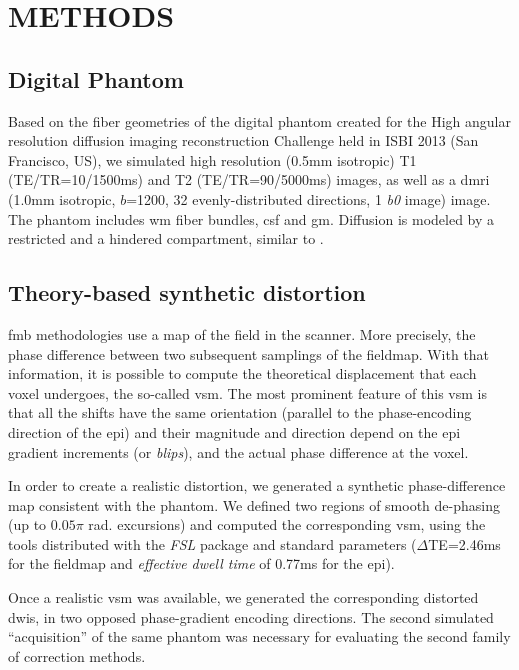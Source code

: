 \section{METHODS}

\subsection{Digital Phantom}
Based on the fiber geometries of the digital phantom 
created for the High angular resolution diffusion imaging 
reconstruction Challenge held in ISBI 2013 
(San Francisco, US), we simulated high resolution 
(0.5mm isotropic) T1 (TE/TR=10/1500ms) and T2 
(TE/TR=90/5000ms) images, as well as a \gls*{dmri}
(1.0mm isotropic, $b$=1200, 32 evenly-distributed 
directions, 1 \textit{b0} image) image.
The phantom includes \gls*{wm} fiber bundles, 
\gls*{csf} and \gls*{gm}. Diffusion is modeled by a 
restricted and a hindered compartment, similar to
\cite{assaf_composite_2005}.

\subsection{Theory-based synthetic distortion}
\label{sec:distortion}
\Gls*{fmb} methodologies use a map
of the field in the scanner. More precisely, the
phase difference between two subsequent samplings
of the fieldmap. With that information, it is possible
to compute the theoretical displacement that each
voxel undergoes, the so-called \gls*{vsm}. The
most prominent feature of this \gls*{vsm} is that all
the shifts have the same orientation (parallel to the
phase-encoding direction of the \gls*{epi}) and their
magnitude and direction depend on the \gls*{epi} 
gradient increments (or \emph{blips}), and the actual
phase difference at the voxel.

In order to create a realistic distortion, we
generated a synthetic phase-difference map 
consistent with the phantom.  We defined two regions 
of smooth de-phasing (up to $0.05\pi$ rad. excursions) 
and computed the corresponding \gls*{vsm}, using the 
tools distributed with the \emph{FSL} package 
\cite{jenkinson_fsl_2012}  and
standard parameters ($\Delta$TE=2.46ms for the
fieldmap and \emph{effective dwell time} of 
0.77ms for the \gls*{epi}).

Once a realistic \gls*{vsm} was available, we generated
the corresponding distorted \glspl*{dwi}, in two opposed
phase-gradient encoding directions. The second simulated
``acquisition'' of the same phantom was necessary 
for evaluating the second family of correction methods.

